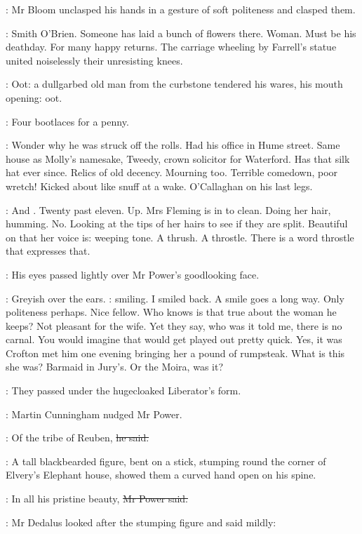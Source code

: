 :
Mr Bloom unclasped his hands in a gesture of soft politeness and clasped them.

\BloomInt:
Smith O'Brien.
Someone has laid a bunch of flowers there.
Woman.
Must be his deathday.
For many happy returns.
The carriage wheeling by Farrell's statue
united noiselessly their unresisting knees.

:
Oot:
a dullgarbed old man from the curbstone tendered his wares,
his mouth opening:
oot.

\man:
Four bootlaces for a penny.

\BloomInt:
Wonder why he was struck off the rolls.
Had his office in Hume street.
Same house as Molly's namesake,
Tweedy, crown solicitor for Waterford.
Has that silk hat ever since.
Relics of old decency.
Mourning too.
Terrible comedown, poor wretch!
Kicked about like snuff at a wake.
O'Callaghan on his last legs.

\BloomInt:
And .
Twenty past eleven.
Up.
Mrs Fleming is in to clean.
Doing her hair, humming.
No.
Looking at the tips of her hairs to see if they are split.
Beautiful on that  her voice is:
weeping tone.
A thrush.
A throstle.
There is a word throstle that expresses that.

:
His eyes passed lightly over Mr Power's goodlooking face.

\BloomInt:
Greyish over the ears.
:
smiling.
I smiled back.
A smile goes a long way.
Only politeness perhaps.
Nice fellow.
Who knows is that true about the woman he keeps?
Not pleasant for the wife.
Yet they say,
who was it told me,
there is no carnal.
You would imagine that would get played out pretty quick.
Yes, it was Crofton met him one evening
bringing her a pound of rumpsteak.
What is this she was?
Barmaid in Jury's.
Or the Moira, was it?

:
They passed under the hugecloaked Liberator's form.

:
Martin Cunningham nudged Mr Power.

\cunningham:
Of the tribe of Reuben,
\sout{he said.}

:
A tall blackbearded figure, bent on a stick,
stumping round the corner of Elvery's Elephant house,
showed them a curved hand open on his spine.

\power:
In all his pristine beauty,
\sout{Mr Power said.}

:
Mr Dedalus looked after the stumping figure and said mildly:


